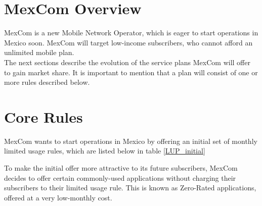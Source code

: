 \section{MexCom Overview}
\noindent
MexCom is a new Mobile Network Operator, which is eager to start operations in Mexico soon. MexCom will target low-income subscribers, who cannot afford an unlimited mobile plan. \\

The next sections describe the evolution of the service plans MexCom will offer to gain market share. It is important to mention that a plan will consist of one or more rules described below.   

\section{Core Rules}
\noindent
MexCom wants to start operations in Mexico by offering an initial set of monthly limited usage rules, which are listed below in table \ref{LUP_initial} \\

\begin{table}[H]
\begin{center}
\end{center}
\caption{Core Limited Usage Rules.}
\label{LUP_initial}
\end{table}

To make the initial offer more attractive to its future subscribers, MexCom decides to offer certain commonly-used applications without charging their subscribers to their limited usage rule. This is known as Zero-Rated applications, offered at a very low-monthly cost. \\

\begin{table}[H]
\begin{center}
\end{center}
\caption{Bolt-on Rules}
\end{table}

